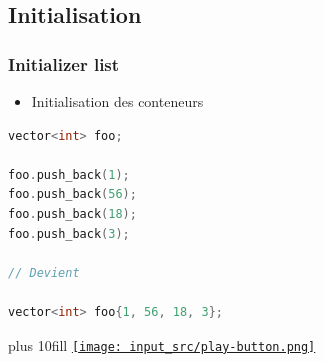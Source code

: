 \documentclass[C++.tex]{subfiles}
\begin{document}
\subsection*{Initialisation}
\begin{frame}[fragile]
	\frametitle{Initializer list}
	\begin{itemize}
		\item Initialisation des conteneurs
	\end{itemize}

	\begin{lstlisting}[language=C++]
vector<int> foo;

foo.push_back(1);
foo.push_back(56);
foo.push_back(18);
foo.push_back(3);

// Devient

vector<int> foo{1, 56, 18, 3};\end{lstlisting}

	\vskip 10mm plus 10fill
	\hfill
	\href{https://godbolt.org/#g:!((g:!((g:!((h:codeEditor,i:(filename:'1',fontScale:14,fontUsePx:'0',j:1,lang:c%2B%2B,selection:(endColumn:1,endLineNumber:39,positionColumn:1,positionLineNumber:39,selectionStartColumn:1,selectionStartLineNumber:39,startColumn:1,startLineNumber:39),source:'%23include+%3Ciostream%3E%0A%23include+%3Cvector%3E%0A%23include+%3Cinitializer_list%3E%0A%0Astruct+Foo%0A%7B%0A++Foo(std::initializer_list%3Cint%3E+l)+:+m_vec(l)%0A++%7B%0A++++std::cout+%3C%3C+l.size()+%3C%3C+!'%5Cn!'%3B%0A++%7D%0A%0A++void+append(std::initializer_list%3Cint%3E+l)%0A++%7B%0A++++for(std::initializer_list%3Cint%3E::iterator+it+%3D+l.begin()%3B+it+!!%3D+l.end()%3B+%2B%2Bit)%0A++++%7B%0A++++++m_vec.push_back(*it)%3B%0A++++%7D%0A++%7D%0A%0A++std::vector%3Cint%3E+m_vec%3B%0A%7D%3B%0A%0Aint+main()%0A%7B%0A++Foo+foo+%3D+%7B1,+2,+3,+4,+5%7D%3B%0A++for(size_t+i+%3D+0%3B+i+%3C+foo.m_vec.size()%3B+%2B%2Bi)%0A++%7B%0A++++std::cout+%3C%3C+foo.m_vec%5Bi%5D+%3C%3C+!'+!'%3B%0A++%7D%0A++std::cout+%3C%3C+!'%5Cn!'%3B%0A%0A++foo.append(%7B6,+7,+8%7D)%3B%0A++for(size_t+i+%3D+0%3B+i+%3C+foo.m_vec.size()%3B+%2B%2Bi)%0A++%7B%0A++++std::cout+%3C%3C+foo.m_vec%5Bi%5D+%3C%3C+!'+!'%3B%0A++%7D%0A++std::cout+%3C%3C+!'%5Cn!'%3B%0A%7D%0A'),l:'5',n:'0',o:'C%2B%2B+source+%231',t:'0')),k:50,l:'4',n:'0',o:'',s:0,t:'0'),(g:!((h:executor,i:(argsPanelShown:'1',compilationPanelShown:'0',compiler:g112,compilerOutShown:'0',execArgs:'',execStdin:'',fontScale:14,fontUsePx:'0',j:1,lang:c%2B%2B,libs:!((name:boost,ver:'175')),options:'-std%3Dc%2B%2B11',source:1,stdinPanelShown:'1',tree:'1',wrap:'0'),l:'5',n:'0',o:'Executor+x86-64+gcc+11.2+(C%2B%2B,+Editor+%231)',t:'0')),header:(),k:50,l:'4',n:'0',o:'',s:0,t:'0')),l:'2',n:'0',o:'',t:'0')),version:4}{\texttt{[image: input\_src/play-button.png]}}
\end{frame}
\end{document}
